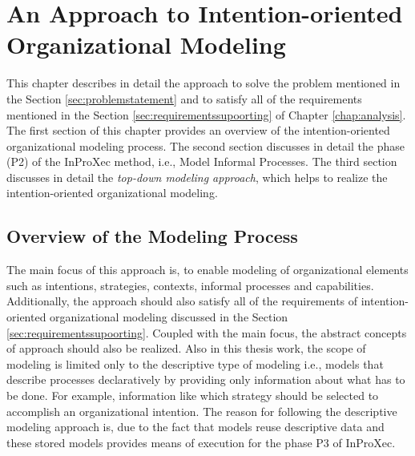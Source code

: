 \chapter{An Approach to Intention-oriented Organizational Modeling}
\label{chap:approach}
This chapter describes in detail the approach to solve the problem mentioned in the Section \ref{sec:problemstatement} and to satisfy all of the requirements mentioned in the Section \ref{sec:requirementssupoorting} of Chapter \ref{chap:analysis}. The first section of this chapter provides an overview of the intention-oriented organizational modeling process. The second section discusses in detail the phase (P2) of the InProXec method, i.e., Model Informal Processes. The third section discusses in detail the \textit{top-down modeling approach}, which helps to realize the intention-oriented organizational modeling. 

\section{Overview of the Modeling Process}
\label{sec:overviewmodelingprocess}
The main focus of this approach is, to enable modeling of organizational elements such as intentions, strategies, contexts, informal processes and capabilities. Additionally, the approach should also satisfy all of the requirements of intention-oriented organizational modeling discussed in the Section \ref{sec:requirementssupoorting}. Coupled with the main focus, the abstract concepts of approach should also be realized. Also in this thesis work, the scope of modeling is limited only to the descriptive type of modeling i.e., models that describe processes declaratively by providing only information about what has to be done. For example, information like which strategy should be selected to accomplish an organizational intention. The reason for following the descriptive modeling approach is, due to the fact that models reuse descriptive data and these stored models provides means of execution for the phase P3 of InProXec. 

